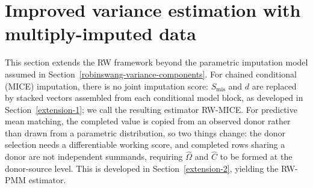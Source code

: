 \section{Improved variance estimation with multiply-imputed data}
\label{improved-variance}
This section extends the RW framework beyond the parametric imputation
model assumed in Section~\ref{robinswang-variance-components}. For
chained conditional (MICE) imputation, there is no joint imputation
score: \(S_{\mathrm{mis}}\) and \(d\) are replaced by stacked vectors
assembled from each conditional model block, as developed in
Section~\ref{extension-1}; we call the resulting estimator RW-MICE.
For predictive mean matching, the completed value is copied from an
observed donor rather than drawn from a parametric distribution, so
two things change: the donor selection needs a differentiable working
score, and completed rows sharing a donor are not independent
summands, requiring \(\widehat\Omega\) and \(\widehat C\) to be
formed at the donor-source level. This is developed in
Section~\ref{extension-2}, yielding the RW-PMM estimator.

